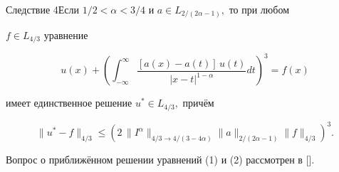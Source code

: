 \smallskip



\begin{newthm}{Следствие 4}Если $1/2<\alpha<3/4$ и $a\in L_{2/(2\alpha-1)},$ то при любом

$f\in L_{4/3}$ уравнение

$$

u(x)+\left(\int _{-\infty}^{\infty}\frac{[a(x)-a(t)]\,u(t)}{|x-t|^{1-\alpha}}dt\right)^3=f(x)

$$

имеет единственное решение $u^*\in L_{4/3},$ причём

$$

\|u^*-f\|_{4/3}\leq \left(2\,\|I^\alpha\|_{4/3\to

4/(3-4\alpha)}\|a\|_{2/(2\alpha-1)}\|f\|_{4/3}\right)^3.

$$

\end{newthm}



Вопрос о приближённом решении уравнений (1) и (2) рассмотрен в [].



